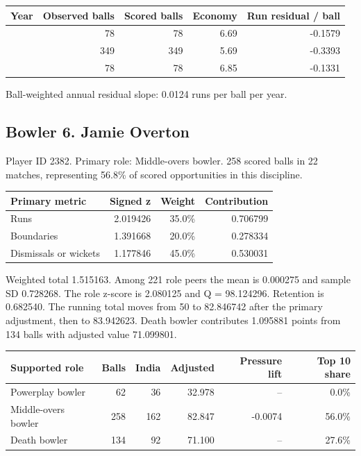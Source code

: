\begin{center}
\begin{tabularx}{\linewidth}{>{\raggedright\arraybackslash}Xrrrr}
\toprule
Year & Observed balls & Scored balls & Economy & Run residual / ball \\
\midrule
2024 & 78 & 78 & 6.69 & -0.1579 \\
2025 & 349 & 349 & 5.69 & -0.3393 \\
2026 & 78 & 78 & 6.85 & -0.1331 \\
\bottomrule
\end{tabularx}
\end{center}

Ball-weighted annual residual slope: 0.0124 runs per ball per year.

\clearpage

\subsection{Bowler 6. Jamie Overton}

Player ID 2382. Primary role: Middle-overs bowler. 258 scored balls in 22 matches, representing 56.8\% of scored opportunities in this discipline.

\begin{center}
\begin{tabularx}{\linewidth}{>{\raggedright\arraybackslash}Xrrr}
\toprule
Primary metric & Signed z & Weight & Contribution \\
\midrule
Runs & 2.019426 & 35.0\% & 0.706799 \\
Boundaries & 1.391668 & 20.0\% & 0.278334 \\
Dismissals or wickets & 1.177846 & 45.0\% & 0.530031 \\
\bottomrule
\end{tabularx}
\end{center}

Weighted total 1.515163. Among 221 role peers the mean is 0.000275 and sample SD 0.728268. The role z-score is 2.080125 and Q = 98.124296. Retention is 0.682540. The running total moves from 50 to 82.846742 after the primary adjustment, then to 83.942623. Death bowler contributes 1.095881 points from 134 balls with adjusted value 71.099801.

\begin{center}
\begin{tabularx}{\linewidth}{>{\raggedright\arraybackslash}Xrrrrr}
\toprule
Supported role & Balls & India & Adjusted & Pressure lift & Top 10 share \\
\midrule
Powerplay bowler & 62 & 36 & 32.978 & -- & 0.0\% \\
Middle-overs bowler & 258 & 162 & 82.847 & -0.0074 & 56.0\% \\
Death bowler & 134 & 92 & 71.100 & -- & 27.6\% \\
\bottomrule
\end{tabularx}
\end{center}

